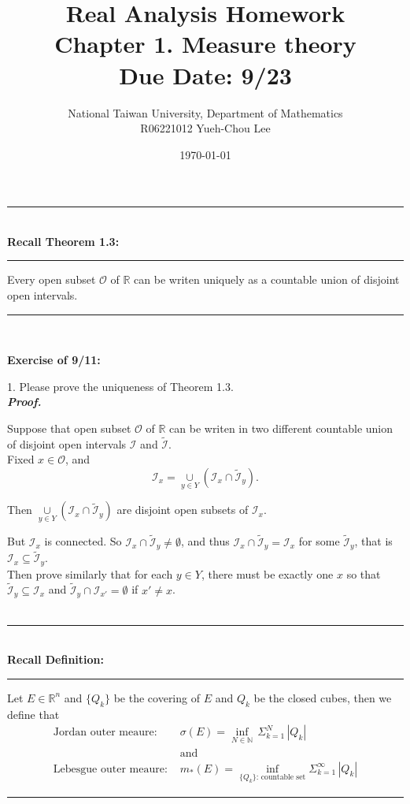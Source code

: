 \documentclass[a4paper,11pt]{article}
\title{Real Analysis Homework\\ Chapter 1. Measure theory\\ Due Date: 9/23}
\author{National Taiwan University, Department of Mathematics\\
R06221012 \hspace{0.2cm} Yueh-Chou Lee}
\date{\today}
\begin{document}
\maketitle

\begin{flushleft}
	\rule[-0.5ex]{17cm}{2pt}\\
		\textbf{Recall Theorem 1.3:}\\
	\rule[1.5ex]{17cm}{0.5pt}
		Every open subset $\mathcal{O}$ of $\mathbb{R}$ can be writen uniquely as a countable union of disjoint open intervals.
	\rule[1.0ex]{17cm}{0.5pt}\
\end{flushleft}

\textbf{Exercise of 9/11:}

1. Please prove the uniqueness of Theorem 1.3.\\

\textbf{\textit{Proof.}}

Suppose that open subset $\mathcal{O}$ of $\mathbb{R}$ can be writen in two different countable union of disjoint open intervals $\mathcal{I}$ and $\mathcal{\widetilde{I}}$.\\

Fixed $x \in \mathcal{O}$, and
	$$\mathcal{I}_x
	= \underset{y \in Y}{\cup} (\mathcal{I}_x
	\cap \mathcal{\widetilde{I}}_y).$$

Then $\underset{y \in Y}{\cup} (\mathcal{I}_x \cap \mathcal{\widetilde{I}}_y)$ are disjoint open subsets of $\mathcal{I}_x$.

But $\mathcal{I}_x$ is connected. So $\mathcal{I}_x \cap \mathcal{\widetilde{I}}_y \neq \emptyset$, and thus $\mathcal{I}_x \cap \mathcal{\widetilde{I}}_y = \mathcal{I}_x$ for some $\mathcal{\widetilde{I}}_y$, that is $\mathcal{I}_x \subseteq \mathcal{\widetilde{I}}_y$.\\

Then prove similarly that for each $y \in Y$, there must be exactly one $x$ so that $\mathcal{\widetilde{I}}_y \subseteq \mathcal{I}_x$ and $\mathcal{\widetilde{I}}_y \cap \mathcal{I}_{x'} = \emptyset$ if $x' \neq x$.\\\\


\begin{flushleft}
	\rule[-0.5ex]{17cm}{2pt}\\
		\textbf{Recall Definition:}\\
	\rule[1.5ex]{17cm}{0.5pt}
		Let $E \in \mathbb{R}^n$ and $\{Q_k\}$ be the covering of $E$ and $Q_k$ be the closed cubes, then we define that
		$$\begin{aligned}
		\text{Jordan outer meaure: }
		&\sigma(E)
		= \underset{N \in \mathbb{N}}{\inf}\,\Sigma_{k=1}^N\,|Q_k|\\
		&\text{and}\\
		\text{Lebesgue outer meaure: }
		&m_*(E) = \underset{\{Q_k\} \text{: countable set}}{\inf} \Sigma_{k=1}^{\infty}\,|Q_k|
		\end{aligned}$$
	\rule[1.0ex]{17cm}{0.5pt}\
\end{flushleft}
\end{document}
